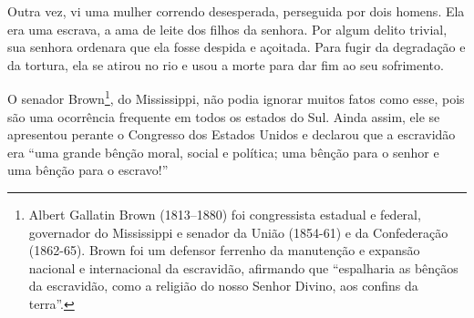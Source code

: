 Outra vez, vi uma mulher correndo
desesperada, perseguida por dois homens. Ela era uma escrava, a ama de
leite dos filhos da senhora. Por algum delito trivial, sua senhora
ordenara que ela fosse despida e açoitada. Para fugir da degradação e da
tortura, ela se atirou no rio e usou a morte para dar fim ao seu
sofrimento.

O senador Brown\footnote{Albert
  Gallatin Brown (1813--1880) foi congressista estadual e federal,
  governador do Mississippi e senador da União (1854-61) e da
  Confederação (1862-65). Brown foi um defensor ferrenho da manutenção e
  expansão nacional e internacional da escravidão, afirmando que
  ``espalharia as bênçãos da escravidão, como a religião do nosso Senhor
  Divino, aos confins da terra''.}, do Mississippi, não podia ignorar
muitos fatos como esse, pois são uma ocorrência frequente em todos os
estados do Sul. Ainda assim, ele se apresentou perante o Congresso dos
Estados Unidos e declarou que a escravidão era ``uma grande bênção
moral, social e política; uma bênção para o senhor e uma bênção para o
escravo!''

